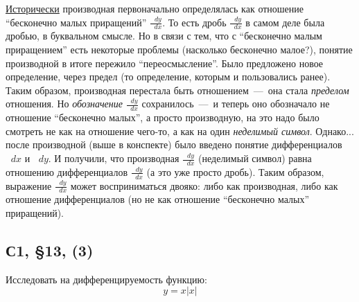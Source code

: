 \documentclass[a4paper,12pt]{article}
\newcommand{\diff}{\mathop{}\!d\!}
\begin{document}
  \href{https://math.stackexchange.com/a/21209/451127}{Исторически} производная первоначально определялась как отношение ``бесконечно малых приращений'' $\frac{\diff y}{\diff x}$.
  То есть дробь $\frac{\diff y}{\diff x}$ в самом деле была дробью, в буквальном смысле.
  Но в связи с тем, что с ``бесконечно малым приращением'' есть некоторые проблемы (насколько бесконечно малое?), понятие производной в итоге пережило ``переосмысление''.
  Было предложено новое определение, через предел (то определение, которым и пользовались ранее).
  Таким образом, производная перестала быть отношением~---~она стала \emph{пределом} отношения.
  Но \emph{обозначение} $\frac{\diff y}{\diff x}$ сохранилось~---~и теперь оно обозначало не отношение ``бесконечно малых'', а просто производную, на это надо было смотреть не как на отношение чего-то, а как на один \emph{неделимый символ}.
  Однако... после производной (выше в конспекте) было введено понятие дифференциалов $\diff x$ и $\diff y$.
  И получили, что производная $\frac{\diff y}{\diff x}$ (неделимый символ) равна отношению дифференциалов $\frac{\diff y}{\diff x}$ (а это уже просто дробь).
  Таким образом, выражение $\frac{\diff y}{\diff x}$ может восприниматься двояко: либо как производная, либо как отношение дифференциалов (но не как отношение ``бесконечно малых'' приращений).


  \subsection{С1, \S 13, (3)} %

  Исследовать на дифференцируемость функцию:
  \[
    y = x |x|
  \]
\end{document}
